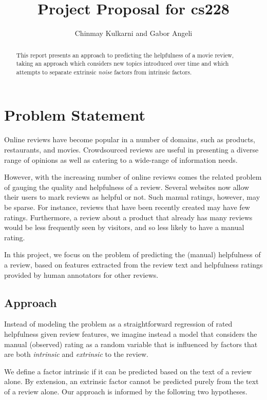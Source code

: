 \documentclass[letter,12pt]{article}
\title{Project Proposal for cs228}
\author{Chinmay Kulkarni and Gabor Angeli}
\begin{document}
\maketitle

\begin{abstract}
This report presents an approach to predicting the helpfulness of a 
	movie review, taking an approach which considers new topics introduced 
	over time and which attempts to separate extrinsic {\em noise} factors 
	from intrinsic factors.
\end{abstract}


\section{Problem Statement}
Online reviews have become popular in a number of domains, such as products, restaurants, and movies. Crowdsourced reviews are useful in presenting a diverse range of opinions as well as catering to a wide-range of information needs. 

However, with the increasing number of online reviews comes the related problem of gauging the quality and helpfulness of a review. Several websites now allow their users to mark reviews as helpful or not. Such manual ratings, however, may be sparse. For instance, reviews that have been recently created may have few ratings. Furthermore, a review about a product that already has many reviews would be less frequently seen by visitors, and so less likely to have a manual rating.  

In this project, we focus on the problem of predicting the (manual) helpfulness of a review, based on features extracted from the review text and  helpfulness ratings provided by human annotators for other reviews. 


\subsection{Approach}
Instead of modeling the problem as a straightforward regression of rated helpfulness given review features, we imagine instead a model that considers the manual (observed) rating as a random variable that is influenced by factors that are both {\em intrinsic} and {\em extrinsic} to the review. 

We define a factor intrinsic if it can be predicted based on the text of a review alone. By extension, an extrinsic factor cannot be predicted purely from the text of a review alone. Our approach is informed by the following two hypotheses. 
\end{document}
